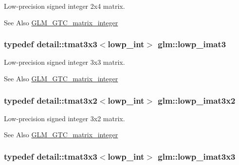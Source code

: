 Low-\/precision signed integer 2x4 matrix. 

\begin{DoxySeeAlso}{See Also}
\hyperlink{group__gtc__matrix__integer}{G\-L\-M\-\_\-\-G\-T\-C\-\_\-matrix\-\_\-integer} 
\end{DoxySeeAlso}
\hypertarget{group__gtc__matrix__integer_ga5ce884d9735040424846bc45671b446a}{
\subsubsection[{lowp\-\_\-imat3}]{\setlength{\rightskip}{0pt plus 5cm}typedef detail\-::tmat3x3$<$lowp\-\_\-int$>$ {\bf glm\-::lowp\-\_\-imat3}}}\label{group__gtc__matrix__integer_ga5ce884d9735040424846bc45671b446a}


Low-\/precision signed integer 3x3 matrix. 

\begin{DoxySeeAlso}{See Also}
\hyperlink{group__gtc__matrix__integer}{G\-L\-M\-\_\-\-G\-T\-C\-\_\-matrix\-\_\-integer} 
\end{DoxySeeAlso}
\hypertarget{group__gtc__matrix__integer_gac67f73a4e34205b8d96af7e85cc7a194}{
\subsubsection[{lowp\-\_\-imat3x2}]{\setlength{\rightskip}{0pt plus 5cm}typedef detail\-::tmat3x2$<$lowp\-\_\-int$>$ {\bf glm\-::lowp\-\_\-imat3x2}}}\label{group__gtc__matrix__integer_gac67f73a4e34205b8d96af7e85cc7a194}


Low-\/precision signed integer 3x2 matrix. 

\begin{DoxySeeAlso}{See Also}
\hyperlink{group__gtc__matrix__integer}{G\-L\-M\-\_\-\-G\-T\-C\-\_\-matrix\-\_\-integer} 
\end{DoxySeeAlso}
\hypertarget{group__gtc__matrix__integer_ga3e100ab14fdaeae0d30d66d93c6904a7}{
\subsubsection[{lowp\-\_\-imat3x3}]{\setlength{\rightskip}{0pt plus 5cm}typedef detail\-::tmat3x3$<$lowp\-\_\-int$>$ {\bf glm\-::lowp\-\_\-imat3x3}}}\label{group__gtc__matrix__integer_ga3e100ab14fdaeae0d30d66d93c6904a7}


